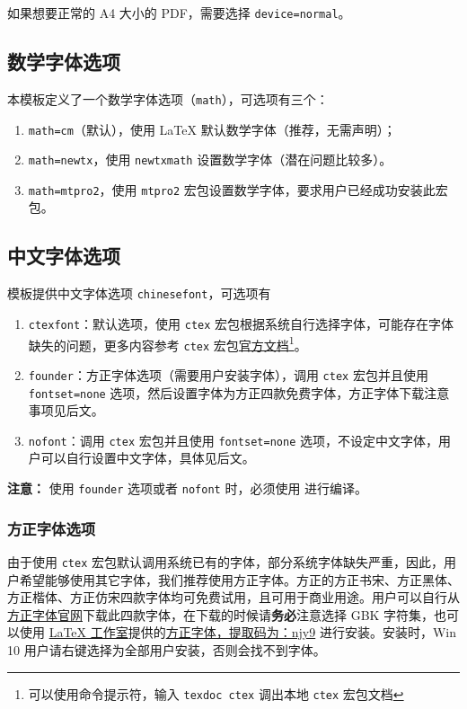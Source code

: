 \documentclass[cn,blue,12pt,normal]{elegantnote}
\begin{document}
\begin{note}
  如果想要正常的 A4 大小的 PDF，需要选择 \lstinline{device=normal}。
\end{note}


\subsection{数学字体选项}

本模板定义了一个数学字体选项（\lstinline{math}），可选项有三个：
\begin{enumerate}
  \item \lstinline{math=cm}（默认），使用 \LaTeX{} 默认数学字体（推荐，无需声明）；
  \item \lstinline{math=newtx}，使用 \lstinline{newtxmath} 设置数学字体（潜在问题比较多）。
  \item \lstinline{math=mtpro2}，使用 \lstinline{mtpro2} 宏包设置数学字体，要求用户已经成功安装此宏包。
\end{enumerate}


\subsection{中文字体选项}
模板提供中文字体选项 \lstinline{chinesefont}，可选项有
\begin{enumerate}
\item \lstinline{ctexfont}：默认选项，使用 \lstinline{ctex} 宏包根据系统自行选择字体，可能存在字体缺失的问题，更多内容参考 \lstinline{ctex} 宏包\href{https://ctan.org/pkg/ctex}{官方文档}\footnote{可以使用命令提示符，输入 \lstinline{texdoc ctex} 调出本地 \lstinline{ctex} 宏包文档}。
\item \lstinline{founder}：方正字体选项（需要用户安装字体），调用 \lstinline{ctex} 宏包并且使用 \lstinline{fontset=none} 选项，然后设置字体为方正四款免费字体，方正字体下载注意事项见后文。
\item \lstinline{nofont}：调用 \lstinline{ctex} 宏包并且使用 \lstinline{fontset=none} 选项，不设定中文字体，用户可以自行设置中文字体，具体见后文。
\end{enumerate}

\noindent \textbf{注意：} 使用 \lstinline{founder} 选项或者 \lstinline{nofont} 时，必须使用  进行编译。

\subsubsection{方正字体选项}
由于使用 \lstinline{ctex} 宏包默认调用系统已有的字体，部分系统字体缺失严重，因此，用户希望能够使用其它字体，我们推荐使用方正字体。方正的{\songti 方正书宋}、{\heiti 方正黑体}、{\kaishu 方正楷体}、{\fangsong 方正仿宋}四款字体均可免费试用，且可用于商业用途。用户可以自行从\href{http://www.foundertype.com/}{方正字体官网}下载此四款字体，在下载的时候请\textbf{务必}注意选择 GBK 字符集，也可以使用 \href{https://www.latexstudio.net/}{\LaTeX{} 工作室}提供的\href{https://pan.baidu.com/s/1BgbQM7LoinY7m8yeP25Y7Q}{方正字体，提取码为：njy9} 进行安装。安装时，{\kaishu Win 10 用户请右键选择为全部用户安装，否则会找不到字体。}
\end{document}
